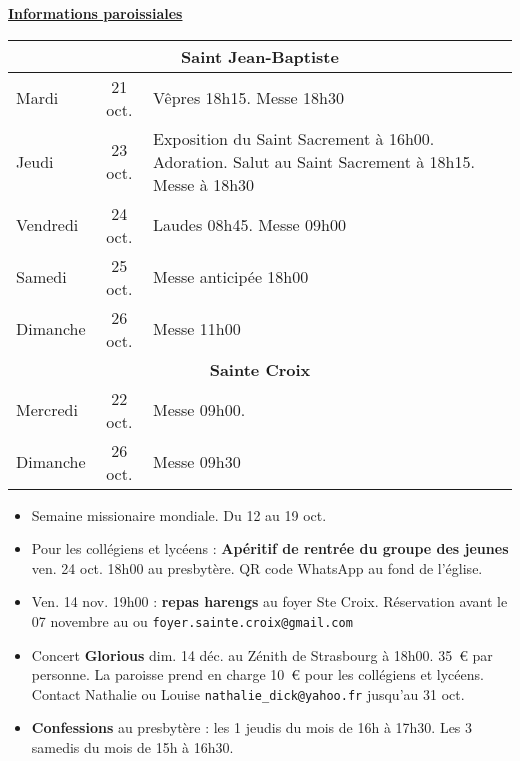 \documentclass[french,11pt]{article}
\newcommand{\NewsItem}[1]{%
\vspace{3pt}
\underline{\textbf{#1}}
		  }
\begin{document}
\NewsItem{Informations paroissiales}

\begin{tabular} {lcp{9cm}}
\multicolumn{3}{c}{\textbf{Saint Jean-Baptiste} } \\ \hline
Mardi    & 21 oct.  & Vêpres 18h15. Messe 18h30 \\ \hline
Jeudi    & 23 oct. &
Exposition du Saint Sacrement à 16h00. Adoration. Salut au Saint Sacrement à 18h15. Messe à 18h30 
 \\ \hline
Vendredi & 24 oct. & Laudes 08h45. Messe 09h00 \\ \hline
Samedi   & 25 oct. & Messe anticipée 18h00 \\ \hline
Dimanche  & 26 oct. & Messe 11h00\\ \hline
\multicolumn{3}{c}{\textbf{Sainte Croix} } \\ \hline
Mercredi & 22 oct.  & Messe 09h00. \\ \hline
Dimanche  & 26 oct. & Messe 09h30\\ \hline
\end{tabular}

\begin{framed}
\begin{itemize}
\item
Semaine missionaire mondiale. Du 12 au 19 oct.
\item
Pour les collégiens et lycéens : \textbf{Apéritif de rentrée du groupe des jeunes} ven. 24 oct. 18h00 au presbytère. QR code WhatsApp au fond de l'église.
\item Ven. 14 nov. 19h00 : \textbf{repas harengs} au foyer Ste Croix. Réservation avant le 07 novembre au  ou \texttt{foyer.sainte.croix@gmail.com}
\item
Concert \textbf{Glorious} dim. 14 déc. au Zénith de Strasbourg à 18h00. 35~€ par personne. La paroisse prend en charge 10~€ pour les collégiens et lycéens. Contact Nathalie ou Louise \texttt{nathalie\_dick@yahoo.fr} jusqu'au 31 oct.
\item
\textbf{Confessions} au presbytère : les 1\iers{} jeudis du mois de 16h à 17h30. Les 3\iemes{} samedis du mois de 15h à 16h30.
\end{itemize}
\end{framed}
\end{document}
